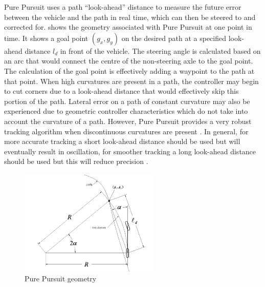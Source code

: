 \documentclass[main.tex]{subfiles}
\begin{document}
Pure Pursuit uses a path ``look-ahead'' distance to measure the future error between the vehicle and the path in real time, which can then be steered to and corrected for.  shows the geometry associated with Pure Pursuit at one point in time. It shows a goal point $(g_x, g_y)$ on the desired path at a specified look-ahead distance $l_d$ in front of the vehicle. The steering angle is calculated based on an arc that would connect the centre of the non-steering axle to the goal point. The calculation of the goal point is effectively adding a waypoint to the path at that point. When high curvatures are present in a path, the controller may begin to cut corners due to a look-ahead distance that would effectively skip this portion of the path. Lateral error on a path of constant curvature may also be experienced due to geometric controller characteristics which do not take into account the curvature of a path. However, Pure Pursuit provides a very robust tracking algorithm when discontinuous curvatures are present \parencite{snider2009}. In general, for more accurate tracking a short look-ahead distance should be used but will eventually result in oscillation, for smoother tracking a long look-ahead distance should be used but this will reduce precision \parencite{snider2009}.
\begin{figure}[ht]
\includegraphics[width=0.6\textwidth]{2-LiteratureReview/purePursuitGoal.png}
\centering
\caption[Pure Pursuit geometry]{Pure Pursuit geometry \parencite{snider2009}} 
\end{figure}

\end{document}
